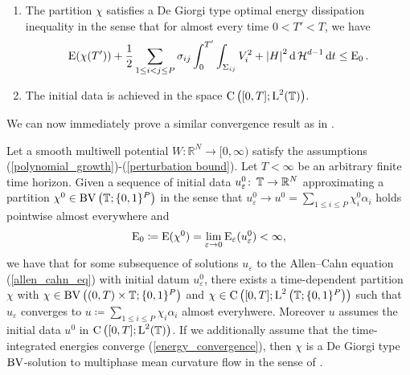 \begin{definition}
\begin{enumerate}
		\item 
		The partition $ \chi $ satisfies a De Giorgi type optimal energy 
		dissipation inequality in the sense that for almost every time $ 0 < T' 
		< T $, we have
		\begin{equation}
			\label{optimal_energy_dissipation_solution}
			\operatorname{E} ( \chi ( T' ) )
			+
			\frac{ 1 }{ 2 }
			\sum_{ 1 \leq i < j \leq P }
				\sigma_{ i j }
				\int_{ 0 }^{ T' }
					\int_{ \Sigma_{ i j } }
						V_{ i }^{ 2 }
						+
						\abs{ H }^{ 2 }
					\dd{ \operatorname{\mathcal{H}}^{ d - 1 } }
				\dd{ t }
			\leq
			\operatorname{E}_{ 0 }.
		\end{equation}
		
		\item
		The initial data is achieved in the space $ \operatorname{C} \left( [ 0 , T ] ; 
		\operatorname{L}^{ 2 } ( \operatorname{\mathbb{T}} ) \right) $.
	\end{enumerate}
\end{definition}

We can now immediately prove a similar convergence result as in 
.
\begin{theorem}
	\label{convergence_to_de_giorgis_multiphase_mcf}
	Let a smooth multiwell potential $ W \colon \mathbb{ R }^{ N } \to [ 0, 
	\infty ) $ satisfy the assumptions 
	(\ref{polynomial_growth})-(\ref{perturbation bound}). Let $ T < \infty 
	$ be an arbitrary finite time horizon. Given a sequence of initial data 
	$ u_{ \varepsilon }^{ 0 } \colon \operatorname{\mathbb{T}} \to \mathbb{ R }^{ N } $ 
	approximating a partition 
	$ \chi^{ 0 } \in \operatorname{BV} \left( \operatorname{\mathbb{T}} ; \{ 0 , 1 \}^{ P } \right) $ 
	in the sense that 
	$ u_{ \varepsilon }^{ 0 } \to u^{ 0 } =  \sum_{ 1 \leq i \leq P } 
	\chi_{ i }^{ 0 } \alpha_{ i } $ 
	holds pointwise almost everywhere and 
	\begin{equation*} 
		\operatorname{E}_{ 0 } 
		\coloneqq 
		\operatorname{E} ( \chi^{ 0 } ) 
		= 
		\lim_{ \varepsilon \to 0 } 
		\operatorname{E}_{ \varepsilon } ( u_{ \varepsilon }^{ 0 } ) 
		< 
		\infty,
	\end{equation*}
	we have that for 
	some subsequence of solutions $ u_{\varepsilon } $ to the Allen--Cahn 
	equation
	(\ref{allen_cahn_eq})  with initial datum $ u_{ 
		\varepsilon }^{ 0 } $, there exists a time-dependent partition $ \chi $ 
	with 
	$ \chi \in \operatorname{BV} \left( ( 0 , T ) \times \operatorname{\mathbb{T}} ; \{ 0 , 1 \}^{ P } 
	\right) $ and
	$ \chi 
	\in \operatorname{C} \left( [ 0 , T ] ; \operatorname{L}^{ 2 } \left( \operatorname{\mathbb{T}} ;  \{ 0 , 1 
	\}^{ P } \right) \right) $ such that $ u_{ \varepsilon } $ converges to 
	$ u \coloneqq \sum_{ 1 \leq i \leq P } \chi_{ i } \alpha_{ i } $ almost 
	everyhwere. Moreover $ u $ assumes the initial data $ u^{ 0 } $ in $ 
	\operatorname{C} \left( [ 0, T ] ; \operatorname{L}^{ 2 }( \operatorname{\mathbb{T}} ) \right) $. If we 
	additionally assume that the 
	time-integrated energies converge (\ref{energy_convergence}), then $ 
	\chi $ is a De Giorgi type $ \operatorname{BV} $-solution to multiphase mean curvature 
	flow in the sense 
	of 
	.
\end{theorem} 

